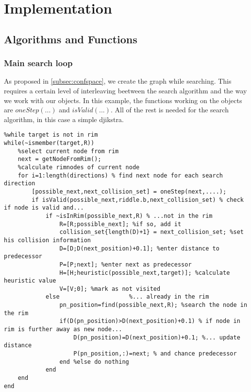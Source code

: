 \chapter{Implementation}
\label{cha:Implementation}

\section{Algorithms and Functions}

\subsection{Main search loop}
As proposed in \ref{subsec:confspace}, we create the graph while searching. This requires a certain level of interleaving beetween the search algorithm and the way we work with our objects. In this example, the functions working on the objects are $oneStep(...)$ and $isValid(...)$. All of the rest is needed for the search algorithm, in this case a simple djikstra.
\lstset{language=Matlab}
\begin{lstlisting}
%while target is not in rim
while(~ismember(target,R))
    %select current node from rim
    next = getNodeFromRim();  
    %calculate rimnodes of current node 
    for i=1:length(directions) % find next node for each search direction
        [possible_next,next_collision_set] = oneStep(next,....); 
        if isValid(possible_next,riddle.b,next_collision_set) % check if node is valid and...
            if ~isInRim(possible_next,R) % ...not in the rim
                R=[R;possible_next]; %if so, add it
                collision_set{length(D)+1} = next_collision_set; %set his collision information
                D=[D;D(next_position)+0.1]; %enter distance to predecessor
                P=[P;next]; %enter next as predecessor
                H=[H;heuristic(possible_next,target)]; %calculate heuristic value
                V=[V;0]; %mark as not visited
            else                    %... already in the rim
                pn_position=find(possible_next,R); %search the node in the rim
                if(D(pn_position)>D(next_position)+0.1) % if node in rim is further away as new node...
                    D(pn_position)=D(next_position)+0.1; %... update distance
                    P(pn_position,:)=next; % and chance predecessor
                end %else do nothing
            end
    end  
end
\end{lstlisting}

